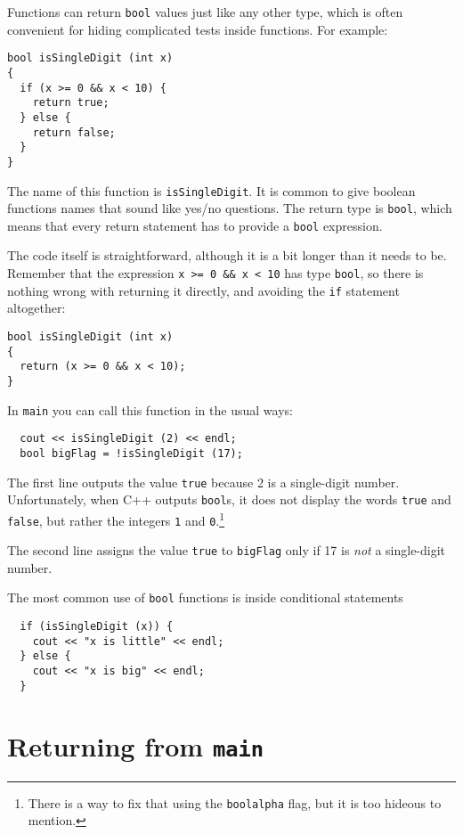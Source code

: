 Functions can return {\tt bool} values just like any other type,
which is often convenient for hiding complicated tests inside
functions.  For example:

\begin{verbatim}
bool isSingleDigit (int x)
{
  if (x >= 0 && x < 10) {
    return true;
  } else {
    return false;
  }
}
\end{verbatim}
%
The name of this function is {\tt isSingleDigit}.  It is common
to give boolean functions names that sound like yes/no questions.
The return type is {\tt bool}, which means that every return
statement has to provide a {\tt bool} expression.

The code itself is straightforward, although it is a bit longer than
it needs to be.  Remember that the expression {\tt x >= 0 \&\& x < 10}
has type {\tt bool}, so there is nothing wrong with returning it
directly, and avoiding the {\tt if} statement altogether:

\begin{verbatim}
bool isSingleDigit (int x)
{
  return (x >= 0 && x < 10);
}
\end{verbatim}
%
In {\tt main} you can call this function in the usual ways:

\begin{verbatim}
  cout << isSingleDigit (2) << endl;
  bool bigFlag = !isSingleDigit (17);
\end{verbatim}
%
The first line outputs the value {\tt true} because 2 is a
single-digit number.  Unfortunately, when C++ outputs {\tt bool}s, it
does not display the words {\tt true} and {\tt false}, but rather the
integers {\tt 1} and {\tt 0}.\footnote{There is a way to fix that
using the {\tt boolalpha} flag, but it is too hideous to mention.}

The second line assigns the value {\tt true} to {\tt bigFlag}
only if 17 is {\em not} a single-digit number.

The most common use of {\tt bool} functions is inside conditional
statements

\begin{verbatim}
  if (isSingleDigit (x)) {
    cout << "x is little" << endl;
  } else {
    cout << "x is big" << endl;
  }
\end{verbatim}

\section {Returning from {\tt main}}

